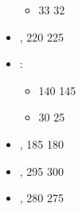 \begin{itemize}
\begin{itemize}
\item \extramodel{} 33 \costdown{} 32
\end{itemize}
\item \rhamphodonriders{}, \basecost{} 220 \costup{} 225
\item \weaponbeasts{}\spacebeforecolon{}:
\begin{itemize}
\item \basecost{} 140 \costup{} 145
\item \salamander{} 30 \costdown{} 25
\end{itemize}
\item \pteradonsentries{}, \basecost{} 185 \costdown{} 180
\item \stygiosaur{}, \basecost{} 295 \costup{} 300
\item \thyroscutus{}, \basecost{} 280 \costdown{} 275
\end{itemize}
